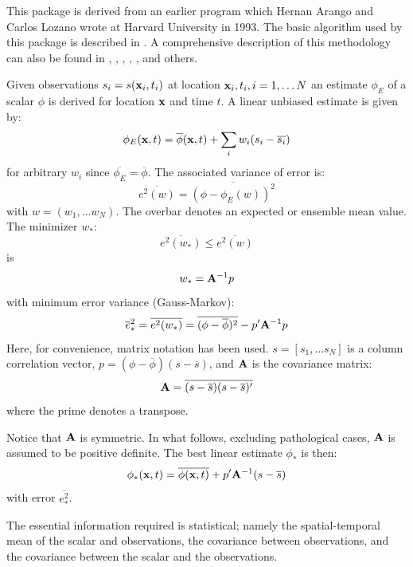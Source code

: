 This  package is derived from an earlier program which Hernan
Arango and Carlos Lozano wrote at Harvard University in 1993.   The
basic algorithm used by this package is described in
\cite{Carter87}.  A comprehensive description of this
methodology can also be found in \cite{Gandin63},
\cite{Bretherton76}, \cite{McWilliams86},
\cite{Daley91}, \cite{Bennett92}, and others.

Given observations $s_i = s({\bf x}_i, t_i)$ at location ${\bf x}_i,
t_i, i = 1, \ldots N$ an estimate $\phi_E$ of a scalar $\phi$ is
derived for location ${\bf x}$ and time $t$.  A linear unbiased estimate
is given by:
\[
   \phi_E({\bf x}, t) = \overline{\phi}({\bf x},t) + \sum_i w_i (s_i -
   \overline{s_i})
\]
for arbitrary $w_i$ since $\overline{\phi_E} = \overline{\phi}$.  The
associated variance of error is:
\[
  \overline{e^2(w)} = \overline{(\phi - \phi_E(w))^2}
\]
with $w = (w_1, \ldots w_N)$.  The overbar denotes an expected or
ensemble mean value.  The minimizer $w_*$:
\[
   \overline{e^2 (w_*)} \leq \overline{e^2(w)}
\]
is
\[
   w_* = {\bf A}^{-1} p
\]
with minimum error variance (Gauss-Markov):
\[
   \overline{e}^2_* = \overline{e^2(w_*)} = \overline{(\phi -
   \overline{\phi})^2} - p' {\bf A}^{-1} p
\]
Here, for convenience, matrix notation has been used.  $s = [s_1, \ldots
s_N]$ is a column correlation vector, $p = (\phi - \overline{\phi})(s
- \overline{s})$, and ${\bf A}$ is the covariance matrix:
\[
   {\bf A} = \overline{(s - \overline{s})(s - \overline{s})'}
\]
where the prime denotes a transpose.

Notice that ${\bf A}$ is symmetric.  In what follows, excluding
pathological cases, ${\bf A}$ is assumed to be positive definite.
The best linear estimate $\phi_*$ is then:
\[
   \phi_*({\bf x}, t) = \overline{\phi({\bf x}, t)} + p' {\bf A}^{-1}
   (s - \overline{s})
\]
with error $\overline{e^2_*}$.

The essential information required is statistical; namely the
spatial-temporal mean of the scalar and observations, the covariance
between observations, and the covariance between the scalar and the
observations.


